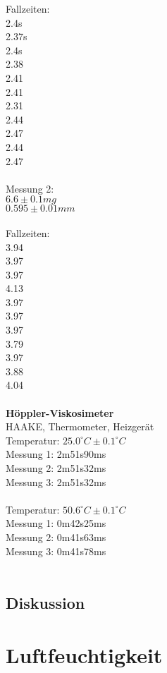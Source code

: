 \documentclass[12pt,a4paper]{article}
\begin{document}
\begin{multicols}{2}
Fallzeiten:\\
2.4s\\
2.37s\\
2.4s\\
2.38\\
2.41\\
2.41\\
2.31\\
2.44\\
2.47\\
2.44\\
2.47\\
\\
Messung 2:\\
$6.6 \pm 0.1mg$\\
$0.595 \pm 0.01mm$\\
\\
Fallzeiten:\\
3.94\\
3.97\\
3.97\\
4.13\\
3.97\\
3.97\\
3.97\\
3.79\\
3.97\\
3.88\\
4.04\\
\\
\textbf{Höppler-Viskosimeter}\\
HAAKE, Thermometer, Heizgerät\\
Temperatur: $25.0^{\circ}C \pm 0.1^{\circ}C$\\
Messung 1: 2m51s90ms\\
Messung 2: 2m51s32ms\\
Messung 3: 2m51s32ms\\
\\
Temperatur: $50.6^{\circ}C \pm 0.1^{\circ}C$\\
Messung 1: 0m42s25ms\\
Messung 2: 0m41s63ms\\
Messung 3: 0m41s78ms\\
\\
\subsection{Diskussion}


\section{Luftfeuchtigkeit}

\end{multicols}
\end{document}
